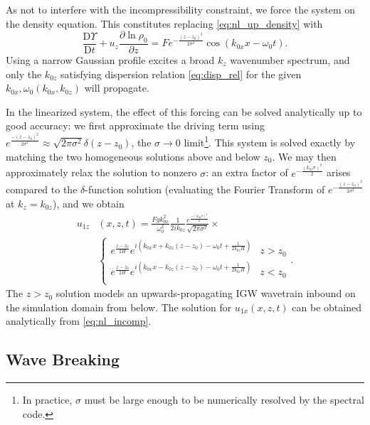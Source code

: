 \documentclass[
        fleqn,
        usenatbib,
    ]{mnras}
\newcommand*{\pd}[2]{\frac{\partial#1}{\partial#2}}
\newcommand*{\md}[2]{\frac{\mathrm{D}#1}{\mathrm{D}#2}}
\newcommand*{\p}[1]{\left(#1\right)}
\begin{document}
As not to interfere with the incompressibility constraint, we force the system
on the density equation. This constitutes replacing \autoref{eq:nl_up_density}
with
\begin{equation}
    \md{\Upsilon}{t} + u_z\pd{\ln \rho_0}{z}
        = Fe^{-\frac{(z - z_0)^2}{2\sigma^2}}
            \cos \p{k_{0x}x - \omega_0 t}.\label{eq:vol_drive}
\end{equation}
Using a narrow Gaussian profile excites a broad $k_z$ wavenumber spectrum, and
only the $k_{0z}$ satisfying dispersion relation \autoref{eq:disp_rel} for the
given $k_{0x}, \omega_0(k_{0x}, k_{0z})$ will propagate.

In the linearized system, the effect of this forcing can be solved analytically
up to good accuracy: we first approximate the driving term using
$e^{\frac{-(z - z_0)^2}{2\sigma^2}} \approx \sqrt{2\pi \sigma^2}\delta(z -
z_0)$, the $\sigma \to 0$ limit\footnote{In practice, $\sigma$ must be large
enough to be numerically resolved by the spectral code.}. This system is solved
exactly by matching the two homogeneous solutions above and below $z_0$. We may
then approximately relax the solution to nonzero $\sigma$: an extra factor of
$e^{-\frac{(k_{0z}\sigma)^2}{2}}$ arises compared to the $\delta$-function
solution (evaluating the Fourier Transform of $e^{-\frac{(z -
z_0)^2}{2\sigma^2}}$ at $k_z = k_{0z}$), and we obtain
\begin{align}
    u_{1z}&(x, z, t) ={} \frac{Fgk_{0x}^2}{\omega_0^2}
        \frac{1}{2ik_{0z}}\frac{e^{\frac{-(k_{0z}\sigma)^2}{2}}}
        {\sqrt{2\pi\sigma^2}} \times\nonumber\\
        &{}\begin{cases}
        e^{\frac{z - z_0}{2H}}e^{i\p{k_{0x}x + k_{0z}(z - z_0) - \omega_0 t
            + \frac{1}{2k_{0z}H}}}
            & z > z_0\\
        e^{\frac{z - z_0}{2H}}e^{i\p{k_{0x}x - k_{0z}(z - z_0) - \omega_0 t
            + \frac{1}{2k_{0z}H}}}
            & z < z_0\\
    \end{cases}.\label{eq:uz_lin}
\end{align}
The $z > z_0$ solution models an upwards-propagating IGW wavetrain inbound on
the simulation domain from below. The solution for $u_{1x}(x, z, t)$ can be
obtained analytically from \autoref{eq:nl_incomp}.

\subsection{Wave Breaking}
\end{document}
